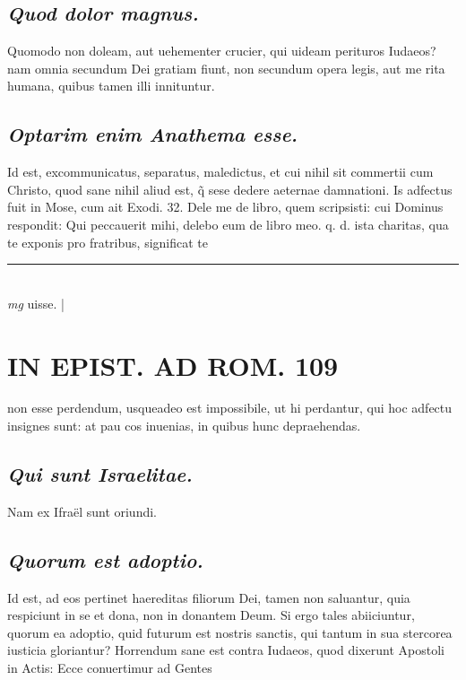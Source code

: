 \documentclass{article}
\begin{document}
\begin{pages}
\subsection*{\textit{Quod dolor magnus. }}\pstart Quomodo non doleam, aut uehementer crucier, qui uideam perituros Iudaeos? nam omnia secundum Dei gratiam fiunt, non secundum opera legis, aut me rita humana, quibus tamen illi innituntur.   \pend
{}
{}
\subsection*{\textit{Optarim enim Anathema esse. }}\pstart Id est, excommunicatus, separatus, maledictus, et cui nihil sit commertii cum Christo, quod sane nihil aliud est, q̃ sese dedere aeternae damnationi. Is adfectus fuit in Mose, cum ait Exodi. 32. Dele me de libro, quem scripsisti: cui Dominus respondit: Qui peccauerit mihi, delebo eum de libro meo. q. d. ista charitas, qua te exponis pro fratribus, significat te  \pend
\vspace{0.5cm}\noindent
\vspace{0.2cm}\rule{1cm}{0.2pt}\\ 
\hspace{0.2cm}\textit{mg}
\footnotesize uisse. 
\normalsize| 
\section*{IN EPIST. AD ROM.  109 }
\marginpar{[ p.]}\pstart non esse perdendum, usqueadeo est impossibile, ut hi perdantur, qui hoc adfectu insignes sunt: at pau cos inuenias, in quibus hunc depraehendas.   \pend
{}
{}
\subsection*{\textit{Qui sunt Israelitae. }}\pstart Nam ex Ifraël sunt oriundi.   \pend
{}
{}
\subsection*{\textit{Quorum est adoptio. }}\pstart Id est, ad eos pertinet haereditas filiorum Dei, tamen non saluantur, quia respiciunt in se et dona, non in donantem Deum. Si ergo tales abiiciuntur, quorum ea adoptio, quid futurum est nostris sanctis, qui tantum in sua stercorea iusticia gloriantur? Horrendum sane est contra Iudaeos, quod dixerunt Apostoli in Actis: Ecce conuertimur ad Gentes\pend
{}
{}

\end{pages}
\end{document}
